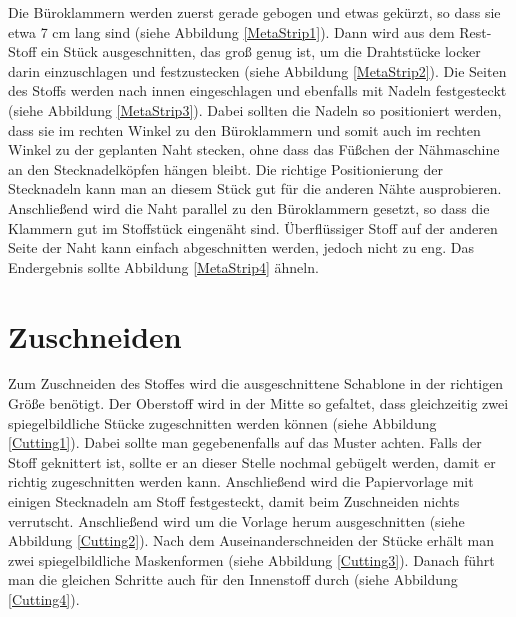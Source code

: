 \documentclass[12pt,parskip=full]{scrartcl}
\begin{document}
Die Büroklammern werden zuerst gerade gebogen und etwas gekürzt, so dass sie etwa 7 cm lang sind (siehe Abbildung \ref{MetaStrip1}). Dann wird aus dem Rest-Stoff ein Stück ausgeschnitten, das groß genug ist, um die Drahtstücke locker darin einzuschlagen und festzustecken (siehe Abbildung \ref{MetaStrip2}). Die Seiten des Stoffs werden nach innen eingeschlagen und ebenfalls mit Nadeln festgesteckt (siehe Abbildung \ref{MetaStrip3}). Dabei sollten die Nadeln so positioniert werden, dass sie im rechten Winkel zu den Büroklammern und somit auch im rechten Winkel zu der geplanten Naht stecken, ohne dass das Füßchen der Nähmaschine an den Stecknadelköpfen hängen bleibt. Die richtige Positionierung der Stecknadeln kann man an diesem Stück gut für die anderen Nähte ausprobieren. Anschließend wird die Naht parallel zu den Büroklammern gesetzt, so dass die Klammern gut im Stoffstück eingenäht sind. Überflüssiger Stoff auf der anderen Seite der Naht kann einfach abgeschnitten werden, jedoch nicht zu eng. Das Endergebnis sollte Abbildung \ref{MetaStrip4} ähneln.

\section{Zuschneiden}
Zum Zuschneiden des Stoffes wird die ausgeschnittene Schablone in der richtigen Größe benötigt. Der Oberstoff wird in der Mitte so gefaltet, dass gleichzeitig zwei spiegelbildliche Stücke zugeschnitten werden können (siehe Abbildung \ref{Cutting1}). Dabei sollte man gegebenenfalls auf das Muster achten. Falls der Stoff geknittert ist, sollte er an dieser Stelle nochmal gebügelt werden, damit er richtig zugeschnitten werden kann. Anschließend wird die Papiervorlage mit einigen Stecknadeln am Stoff festgesteckt, damit beim Zuschneiden nichts verrutscht. Anschließend wird um die Vorlage herum ausgeschnitten (siehe Abbildung \ref{Cutting2}). Nach dem Auseinanderschneiden der Stücke erhält man zwei spiegelbildliche Maskenformen (siehe Abbildung \ref{Cutting3}). Danach führt man die gleichen Schritte auch für den Innenstoff durch (siehe Abbildung \ref{Cutting4}).
\end{document}
